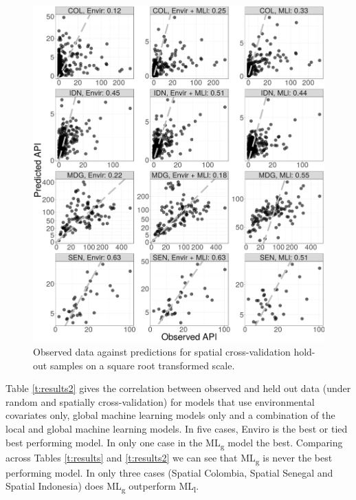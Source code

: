 \documentclass[review]{elsarticle}
\begin{document}
\begin{figure}
  \includegraphics[width=\textwidth]{figs/cv2_l_scatter.png}
\caption{
  Observed data against predictions for spatial cross-validation hold-out samples on a square root transformed scale.
}
\label{f:scatter2}
\end{figure}


Table \ref{t:results2} gives the correlation between observed and held out data (under random and spatially cross-validation) for models that use environmental covariates only, global machine learning models only and a combination of the local and global machine learning models.
In five cases, Enviro is the best or tied best performing model.
In only one case in the ML\textsubscript{g} model the best.
Comparing across Tables \ref{t:results} and \ref{t:results2} we can see that ML\textsubscript{g} is never the best performing model.
In only three cases (Spatial Colombia, Spatial Senegal and Spatial Indonesia) does ML\textsubscript{g} outperform ML\textsubscript{l}.
\end{document}
